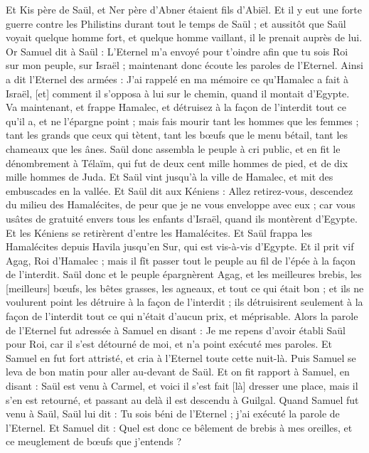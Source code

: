 \begin{multicols}{2}
Et Kis père de Saül, et Ner père d'Abner étaient fils d'Abiël.
Et il y eut une forte guerre contre les Philistins durant tout le temps de Saül ; et aussitôt que Saül voyait quelque homme fort, et quelque homme vaillant, il le prenait auprès de lui.
\VerseOne{}Or Samuel dit à Saül : L'Eternel m'a envoyé pour t'oindre afin que tu sois Roi sur mon peuple, sur Israël ; maintenant donc écoute les paroles de l'Eternel.
Ainsi a dit l'Eternel des armées : J'ai rappelé en ma mémoire ce qu'Hamalec a fait à Israël, [et] comment il s'opposa à lui sur le chemin, quand il montait d'Egypte.
Va maintenant, et frappe Hamalec, et détruisez à la façon de l'interdit tout ce qu'il a, et ne l'épargne point ; mais fais mourir tant les hommes que les femmes ; tant les grands que ceux qui tètent, tant les bœufs que le menu bétail, tant les chameaux que les ânes.
Saül donc assembla le peuple à cri public, et en fit le dénombrement à Télaïm, qui fut de deux cent mille hommes de pied, et de dix mille hommes de Juda.
Et Saül vint jusqu'à la ville de Hamalec, et mit des embuscades en la vallée.
Et Saül dit aux Kéniens : Allez retirez-vous, descendez du milieu des Hamalécites, de peur que je ne vous enveloppe avec eux ; car vous usâtes de gratuité envers tous les enfants d'Israël, quand ils montèrent d'Egypte. Et les Kéniens se retirèrent d'entre les Hamalécites.
Et Saül frappa les Hamalécites depuis Havila jusqu'en Sur, qui est vis-à-vis d'Egypte.
Et il prit vif Agag, Roi d'Hamalec ; mais il fît passer tout le peuple au fil de l'épée à la façon de l'interdit.
Saül donc et le peuple épargnèrent Agag, et les meilleures brebis, les [meilleurs] bœufs, les bêtes grasses, les agneaux, et tout ce qui était bon ; et ils ne voulurent point les détruire à la façon de l'interdit ; ils détruisirent seulement à la façon de l'interdit tout ce qui n'était d'aucun prix, et méprisable.
Alors la parole de l'Eternel fut adressée à Samuel en disant :
Je me repens d'avoir établi Saül pour Roi, car il s'est détourné de moi, et n'a point exécuté mes paroles. Et Samuel en fut fort attristé, et cria à l'Eternel toute cette nuit-là.
Puis Samuel se leva de bon matin pour aller au-devant de Saül. Et on fit rapport à Samuel, en disant : Saül est venu à Carmel, et voici il s'est fait [là] dresser une place, mais il s'en est retourné, et passant au delà il est descendu à Guilgal.
Quand Samuel fut venu à Saül, Saül lui dit : Tu sois béni de l'Eternel ; j'ai exécuté la parole de l'Eternel.
Et Samuel dit : Quel est donc ce bêlement de brebis à mes oreilles, et ce meuglement de bœufs que j'entends ?

\end{multicols}
